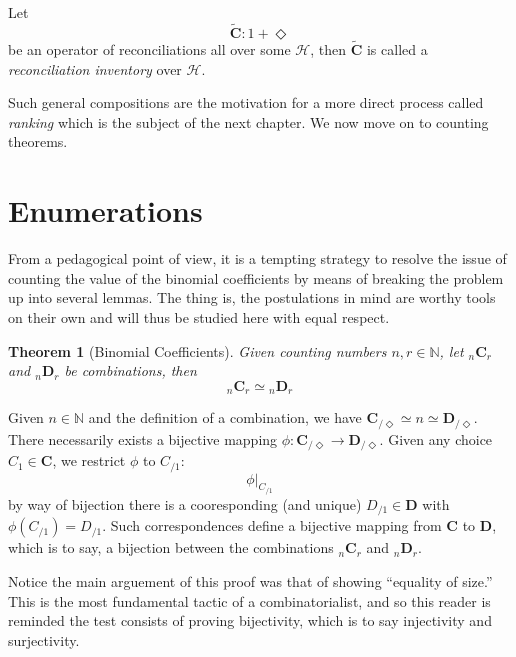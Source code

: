 \documentclass[twoside]{book}
\newcommand{\pass}[1][\Diamond]{\ensuremath{{_{\!/{#1}}}}}
\newcommand{\syntax}[1][\Diamond]{\ensuremath{1+{#1}}}
\renewcommand{\bold}[1][C]{\ensuremath{{\mathbf #1}}}
\newcommand{\nCr}[1][C]{\ensuremath{{_n{\mathbf #1}_r}}}
\newtheorem{theorem}{Theorem}[section]
\newenvironment{proof}[1][Proof]{\begin{trivlist}
\item[\hskip \labelsep {\bfseries #1}]}{\end{trivlist}}
\newenvironment{definition}[1][Definition]{\begin{trivlist}
\item[\hskip \labelsep {\bfseries Definition (#1):}]}{\end{trivlist}}
\newcommand{\qed}{\nobreak \ifvmode \relax \else
      \ifdim\lastskip<1.5em \hskip-\lastskip
      \hskip1.5em plus0em minus0.5em \fi \nobreak
      \vrule height0.5em width0.5em depth0.25em\fi}
\begin{document}
\begin{definition}[\hypertarget{ReconciliationInventory}{\hyperlink{oReconciliationInventory}{Reconciliation Inventory}}]

Let
$$ \tilde{\bold}:\syntax $$
be an operator of reconciliations all over some $ \mathcal{H} $, then
$ \tilde{\bold} $ is called a \emph{reconciliation inventory} over $ \mathcal{H} $.

\end{definition}

Such general compositions are the motivation for a more direct process called \emph{ranking} which is the
subject of the next chapter.  We now move on to counting theorems.

\section{Enumerations}

From a pedagogical point of view, it is a tempting strategy to resolve the issue of counting the value of the
binomial coefficients by means of breaking the problem up into several lemmas.  The thing is, the postulations
in mind are worthy tools on their own and will thus be studied here with equal respect.

\begin{theorem}[Binomial Coefficients]

Given counting numbers $ n, r\in\mathbb{N} $, let $ \nCr $ and $ \nCr[D] $ be combinations, then
$$ \nCr\simeq\nCr[D] $$

\end{theorem}

\begin{proof}

Given $ n\in\mathbb{N} $ and the definition of a combination, we have $ \bold\pass\simeq n\simeq\bold[D]\pass $.
There necessarily exists a bijective mapping $ \phi:\bold\pass\to\bold[D]\pass $.  Given any choice $ C_1\in\bold $,
we restrict $ \phi $ to $ C\pass[1] $:
$$ \phi|_{C\pass[1]} $$
by way of bijection there is a cooresponding (and unique) $ D\pass[1]\in\bold[D] $ with $ \phi(C\pass[1])=D\pass[1] $.
Such correspondences define a bijective mapping from $ \bold $ to $ \bold[D] $, which is to say, a bijection between
the combinations $ \nCr $ and $ \nCr[D] $.\qed

\end{proof}

Notice the main arguement of this proof was that of showing ``equality of size.''  This is the most fundamental
tactic of a combinatorialist, and so this reader is reminded the test consists of proving bijectivity, which
is to say injectivity and surjectivity.
\end{document}
